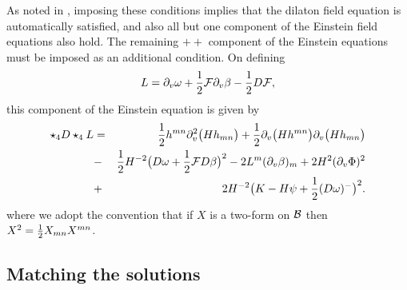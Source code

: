 As noted in \cite{Cariglia:2004kk}, imposing these conditions implies that the dilaton field equation is automatically satisfied, and also all but one component of the Einstein field equations also hold. The remaining $++$ component of the Einstein equations must be imposed
as an additional condition. On defining
\begin{eqnarray}
L=\partial_v \omega +{1 \over 2} {\cal{F}} \partial_v \beta -{1 \over 2}D {\cal{F}},
\end{eqnarray}
this component of the Einstein equation is given by
\begin{eqnarray}
\star_4 D \star_4 L &=&{1 \over 2} h^{mn} \partial_v^2 \big(H h_{mn} \big)
+{1 \over 2} \partial_v \big(H h^{mn} \big) \partial_v \big(H h_{mn} \big)\nonumber \\
&-& {1 \over 2} H^{-2} \big(D \omega +{1 \over 2} {\cal{F}} D \beta \big)^2 -2 L^m ({\partial_v} \beta)_m+2 H^2 (\partial_v \Phi)^2
\nonumber \\
&+& 2 H^{-2} \big(K-H \psi +{1 \over 2} (D \omega)^- \big)^2.
\label{nulleinst}
\end{eqnarray}
where we adopt the convention that if $X$ is a two-form on ${\cal{B}}$ then $X^2={1 \over 2} X_{mn} X^{mn}$.


\subsection{Matching the solutions}

